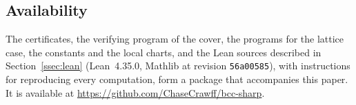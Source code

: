 \subsection{Availability}\label{ssec:avail}

The certificates, the verifying program of the cover, the programs for the lattice case, the constants and the local charts,
and the Lean sources described in Section~\ref{ssec:lean} (Lean~4.35.0, Mathlib at revision \texttt{56a00585}), with
instructions for reproducing every computation, form a package that accompanies this paper. It is available at
\url{https://github.com/ChaseCrawff/bcc-sharp}.
